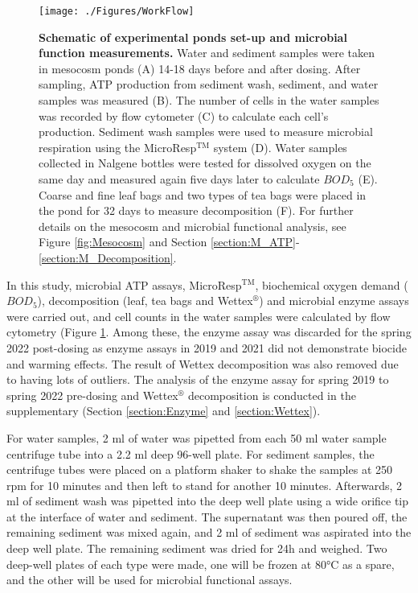 \documentclass[11pt, a4paper]{article}
\begin{document}
\begin{spacing}{1.5}
\begin{figure}[H]
    \centering
    \texttt{[image: ./Figures/WorkFlow]}
    \caption{\textbf{Schematic of experimental ponds set-up and microbial function measurements.} Water and sediment samples were taken in mesocosm ponds (A) 14-18 days before and after dosing. After sampling, ATP production from sediment wash, sediment, and water samples was measured (B). The number of cells in the water samples was recorded by flow cytometer (C) to calculate each cell's production. Sediment wash samples were used to measure microbial respiration using the MicroResp$^\text{TM}$ system (D). Water samples collected in Nalgene bottles were tested for dissolved oxygen on the same day and measured again five days later to calculate $BOD_5$ (E). Coarse and fine leaf bags and two types of tea bags were placed in the pond for 32 days to measure decomposition (F). For further details on the mesocosm and microbial functional analysis, see Figure \ref{fig:Mesocosm} and Section \ref{section:M_ATP}-\ref{section:M_Decomposition}.}
    \label{fig:WorkFlow}
\end{figure}

In this study, microbial ATP assays, MicroResp$^\text{TM}$, biochemical oxygen demand ($BOD_5$), decomposition (leaf, tea bags and Wettex$^\circledR$) and microbial enzyme assays were carried out, and cell counts in the water samples were calculated by flow cytometry (Figure \ref{fig:WorkFlow}. Among these, the enzyme assay was discarded for the spring 2022 post-dosing as enzyme assays in 2019 and 2021 did not demonstrate biocide and warming effects. The result of Wettex decomposition was also removed due to having lots of outliers. The analysis of the enzyme assay for spring 2019 to spring 2022 pre-dosing and Wettex$^\circledR$ decomposition is conducted in the supplementary (Section \ref{section:Enzyme} and \ref{section:Wettex}). 

For water samples, 2 ml of water was pipetted from each 50 ml water sample centrifuge tube into a 2.2 ml deep 96-well plate. For sediment samples, the centrifuge tubes were placed on a platform shaker to shake the samples at 250 rpm for 10 minutes and then left to stand for another 10 minutes. Afterwards, 2 ml of sediment wash was pipetted into the deep well plate using a wide orifice tip at the interface of water and sediment. The supernatant was then poured off, the remaining sediment was mixed again, and 2 ml of sediment was aspirated into the deep well plate. The remaining sediment was dried for 24h and weighed. Two deep-well plates of each type were made, one will be frozen at 80°C as a spare, and the other will be used for microbial functional assays. 


\end{spacing}
\end{document}
